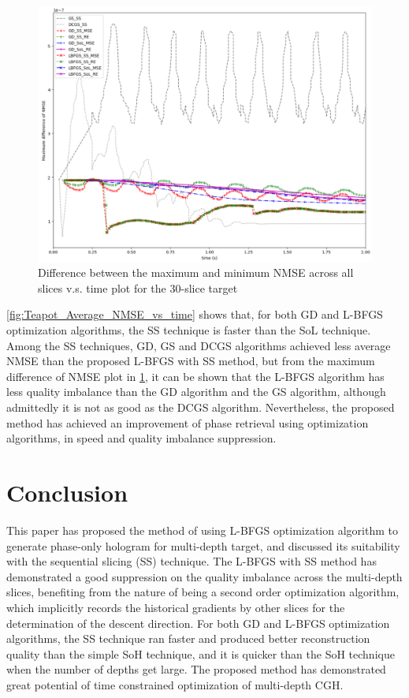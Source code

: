 \begin{figure}[h!]
	\centering
	\includegraphics[width=1.0\textwidth]{Teapot_Max_diff_NMSE_vs_time}
	\caption{Difference between the maximum and minimum NMSE across all slices v.s. time plot for the 30-slice target}
	\label{fig:Teapot_Max_diff_NMSE_vs_time}
\end{figure}

\cref{fig:Teapot_Average_NMSE_vs_time} shows that, for both GD and L-BFGS optimization algorithms, the SS technique is faster than the SoL technique. Among the SS techniques, GD, GS and DCGS algorithms achieved less average NMSE than the proposed L-BFGS with SS method, but from the maximum difference of NMSE plot in \cref{fig:Teapot_Max_diff_NMSE_vs_time}, it can be shown that the L-BFGS algorithm has less quality imbalance than the GD algorithm and the GS algorithm, although admittedly it is not as good as the DCGS algorithm. Nevertheless, the proposed method has achieved an improvement of phase retrieval using optimization algorithms, in speed and quality imbalance suppression.


\section{Conclusion}
This paper has proposed the method of using L-BFGS optimization algorithm to generate phase-only hologram for multi-depth target, and discussed its suitability with the sequential slicing (SS) technique. The L-BFGS with SS method has demonstrated a good suppression on the quality imbalance across the multi-depth slices, benefiting from the nature of being a second order optimization algorithm, which implicitly records the historical gradients by other slices for the determination of the descent direction. For both GD and L-BFGS optimization algorithms, the SS technique ran faster and produced better reconstruction quality than the simple SoH technique, and it is quicker than the SoH technique when the number of depths get large. The proposed method has demonstrated great potential of time constrained optimization of multi-depth CGH.